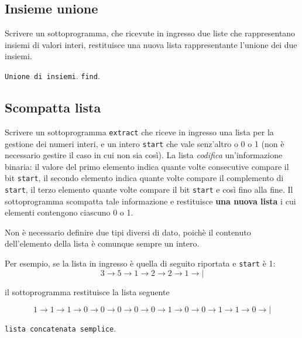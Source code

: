 \subsection{Insieme unione}
Scrivere un sottoprogramma, che ricevute in ingresso due liste che rappresentano insiemi di valori interi, restituisce una nuova lista rappresentante l'unione dei due insiemi.

\begin{tags}
\texttt{Unione di insiemi}. 
\texttt{find}.
\end{tags}



\subsection{Scompatta lista}
Scrivere un sottoprogramma \texttt{extract} che riceve in ingresso una lista per la gestione dei numeri interi, e un intero \texttt{start} che vale senz'altro o 0 o 1 (non \`e necessario gestire il caso in cui non sia cos\`i). La lista \textit{codifica} un'informazione binaria: il valore del primo elemento indica quante volte consecutive compare il bit \texttt{start}, il secondo elemento indica quante volte compare il complemento di \texttt{start}, il terzo elemento quante volte compare il bit  \texttt{start} e cos\`i fino alla fine.
Il sottoprogramma scompatta tale informazione e restituisce \textbf{una nuova lista} i cui elementi contengono ciascuno 0 o 1. 

Non \`e necessario definire due tipi diversi di dato, poich\`e il contenuto dell'elemento della lista \`e comunque sempre un intero. 

 Per esempio, se la lista in ingresso \`e quella di seguito riportata e \texttt{start} \`e 1:
$$
3 \rightarrow 5 \rightarrow 1 \rightarrow 2  \rightarrow 2 \rightarrow 1 \rightarrow|
$$ 

il sottoprogramma restituisce la lista seguente

$$
1 \rightarrow 1 \rightarrow 1 \rightarrow 0 \rightarrow 0 \rightarrow 0 \rightarrow 0 \rightarrow 0 \rightarrow 1 \rightarrow 0 \rightarrow 0 \rightarrow 1 \rightarrow 1 \rightarrow 0 \rightarrow|
$$ 

\begin{tags}
\texttt{lista concatenata semplice}. 
\end{tags}

